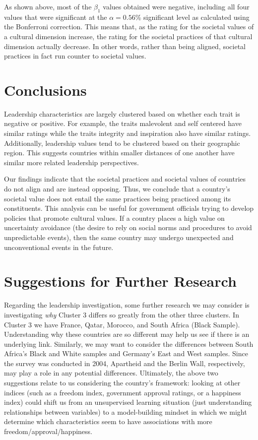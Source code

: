 \documentclass[
]{article}
\begin{document}
As shown above, most of the \(\beta_1\) values obtained were negative,
including all four values that were significant at the
\(\alpha = 0.56\)\% significant level as calculated using the Bonferroni
correction. This means that, as the rating for the societal values of a
cultural dimension increase, the rating for the societal practices of
that cultural dimension actually decrease. In other words, rather than
being aligned, societal practices in fact run counter to societal
values.

\hypertarget{conclusions}{%
\section{Conclusions}\label{conclusions}}

Leadership characteristics are largely clustered based on whether each
trait is negative or positive. For example, the traits malevolent and
self centered have similar ratings while the traits integrity and
inspiration also have similar ratings. Additionally, leadership values
tend to be clustered based on their geographic region. This suggests
countries within smaller distances of one another have similar more
related leadership perspectives.

Our findings indicate that the societal practices and societal values of
countries do not align and are instead opposing. Thus, we conclude that
a country's societal value does not entail the same practices being
practiced among its constituents. This analysis can be useful for
government officials trying to develop policies that promote cultural
values. If a country places a high value on uncertainty avoidance (the
desire to rely on social norms and procedures to avoid unpredictable
events), then the same country may undergo unexpected and unconventional
events in the future.

\hypertarget{suggestions-for-further-research}{%
\section{Suggestions for Further
Research}\label{suggestions-for-further-research}}

Regarding the leadership investigation, some further research we may
consider is investigating \emph{why} Cluster 3 differs so greatly from
the other three clusters. In Cluster 3 we have France, Qatar, Morocco,
and South Africa (Black Sample). Understanding why these countries are
so different may help us see if there is an underlying link. Similarly,
we may want to consider the differences between South Africa's Black and
White samples and Germany's East and West samples. Since the survey was
conducted in 2004, Apartheid and the Berlin Wall, respectively, may play
a role in any potential differences. Ultimately, the above two
suggestions relate to us considering the country's framework: looking at
other indices (such as a freedom index, government approval ratings, or
a happiness index) could shift us from an unsupervised learning
situation (just understanding relationships between variables) to a
model-building mindset in which we might determine which characteristics
seem to have associations with more freedom/approval/happiness.
\end{document}

